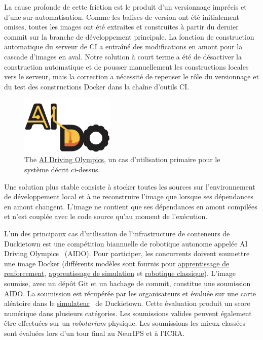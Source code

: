 La cause profonde de cette friction est le produit d'un versionnage imprécis et d'une sur-automatisation. Comme les balises de version ont été initialement omises, toutes les images ont été extraites et construites à partir du dernier commit sur la branche de développement principale. La fonction de construction automatique du serveur de CI a entraîné des modifications en amont pour la cascade d'images en aval. Notre solution à court terme a été de désactiver la construction automatique et de pousser manuellement les constructions locales vers le serveur, mais la correction a nécessité de repenser le rôle du versionnage et du test des constructions Docker dans la chaîne d'outils CI.

\begin{figure}
\includegraphics[width=0.40\textwidth]{../figures/aido_logo.png}
\caption{The \href{https://www.duckietown.org/research/ai-driving-olympics}{AI Driving Olympics}, un cas d'utilisation primaire pour le système décrit ci-dessus.}
\label{fig:aido_logo}
\end{figure}

Une solution plus stable consiste à stocker toutes les sources sur l'environnement de développement local et à ne reconstruire l'image que lorsque ses dépendances en amont changent. L'image ne contient que ses dépendances en amont compilées et n'est couplée avec le code source qu'au moment de l'exécution.

L'un des principaux cas d'utilisation de l'infrastructure de conteneurs de Duckietown est une compétition biannuelle de robotique autonome appelée AI Driving Olympics~\citep{aido2018} (AIDO). Pour participer, les concurrents doivent soumettre une image Docker (différents modèles sont fournis pour \href{https://github.com/duckietown/challenge-aido_LF-baseline-RL-sim-pytorch}{apprentissage de renforcement}, \href{https://github.com/duckietown/challenge-aido_LF-baseline-IL-logs-tensorflow}{apprentissage de simulation} et \href{https://github.com/duckietown/challenge-aido_LF-template-ros}{robotique classique}). L'image soumise, avec un dépôt Git et un hachage de commit, constitue une soumission AIDO. La soumission est récupérée par les organisateurs et évaluée sur une carte aléatoire dans le \href{https://github.com/duckietown/gym-duckietown}{simulateur}~\citep{gym_duckietown} de Duckietown. Cette évaluation produit un score numérique dans plusieurs catégories. Les soumissions valides peuvent également être effectuées sur un \textit{robotarium} physique. Les soumissions les mieux classées sont évaluées lors d'un tour final au NeurIPS et à l'ICRA.

